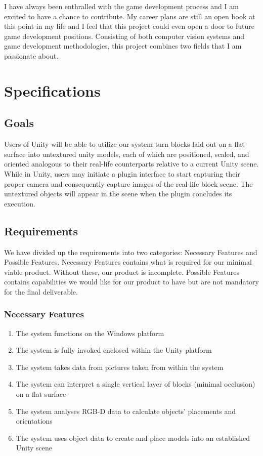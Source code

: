 \documentclass[12pt]{article}
\providecommand{\tightlist}{%
  \setlength{\itemsep}{0pt}\setlength{\parskip}{0pt}}
\begin{document}
I have always been enthralled with the game development process and I am
excited to have a chance to contribute. My career plans are still an
open book at this point in my life and I feel that this project could
even open a door to future game development positions. Consisting of
both computer vision systems and game development methodologies, this
project combines two fields that I am passionate about.

\section{Specifications}\label{specifications}

\subsection{Goals}\label{goals}

Users of Unity will be able to utilize our system turn blocks laid out
on a flat surface into untextured unity models, each of which are
positioned, scaled, and oriented analogous to their real-life
counterparts relative to a current Unity scene. While in Unity, users
may initiate a plugin interface to start capturing their proper camera
and consequently capture images of the real-life block scene. The
untextured objects will appear in the scene when the plugin concludes
its execution.

\subsection{Requirements}\label{requirements}

We have divided up the requirements into two categories: Necessary
Features and Possible Features. Necessary Features contains what is
required for our minimal viable product. Without these, our product is
incomplete. Possible Features contains capabilities we would like for
our product to have but are not mandatory for the final deliverable.

\subsubsection{Necessary Features}\label{necessary-features}

\begin{enumerate}
\def\labelenumi{\arabic{enumi}.}
\tightlist
\item
  The system functions on the Windows platform
\item
  The system is fully invoked enclosed within the Unity platform
\item
  The system takes data from pictures taken from within the system
\item
  The system can interpret a single vertical layer of blocks (minimal
  occlusion) on a flat surface
\item
  The system analyses RGB-D data to calculate objects' placements and
  orientations
\item
  The system uses object data to create and place models into an
  established Unity scene
\end{enumerate}
\end{document}
